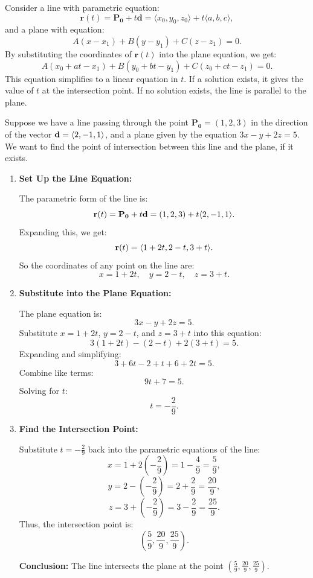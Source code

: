 \noindent Consider a line with parametric equation:
\[
\mathbf{r}(t) = \mathbf{P_0} + t \mathbf{d} = \langle x_0, y_0, z_0 \rangle + t \langle a, b, c \rangle,
\]
and a plane with equation:
\[
A(x - x_1) + B(y - y_1) + C(z - z_1) = 0.
\]
By substituting the coordinates of \( \mathbf{r}(t) \) into the plane equation, we get:
\[
A(x_0 + at - x_1) + B(y_0 + bt - y_1) + C(z_0 + ct - z_1) = 0.
\]
This equation simplifies to a linear equation in \( t \). If a solution exists, it gives the value of \( t \) at the intersection point. If no solution exists, the line is parallel to the plane.


\exampleline
\begin{example}
Suppose we have a line passing through the point \( \mathbf{P_0} = (1, 2, 3) \) in the direction of the vector \( \vb{d} = \langle 2, -1, 1 \rangle \), and a plane given by the equation \( 3x - y + 2z = 5 \). We want to find the point of intersection between this line and the plane, if it exists.

\begin{solution}

\begin{enumerate}
    \item \textbf{Set Up the Line Equation:}

    \noindent The parametric form of the line is:
    \[
    \vb{r}(t) = \vb{P_0} + t \vb{d} = (1, 2, 3) + t \langle 2, -1, 1 \rangle.
    \]
    Expanding this, we get:
    \[
    \vb{r}(t) = \langle 1 + 2t, 2 - t, 3 + t \rangle.
    \]
    So the coordinates of any point on the line are:
    \[
    x = 1 + 2t, \quad y = 2 - t, \quad z = 3 + t.
    \]

    \item \textbf{Substitute into the Plane Equation:}

    \noindent The plane equation is:
    \[
    3x - y + 2z = 5.
    \]
    Substitute \( x = 1 + 2t \), \( y = 2 - t \), and \( z = 3 + t \) into this equation:
    \[
    3(1 + 2t) - (2 - t) + 2(3 + t) = 5.
    \]
    Expanding and simplifying:
    \[
    3 + 6t - 2 + t + 6 + 2t = 5.
    \]
    Combine like terms:
    \[
    9t + 7 = 5.
    \]
    Solving for \( t \):
    \[
    t = -\frac{2}{9}.
    \]

    \item \textbf{Find the Intersection Point:}

    \noindent Substitute \( t = -\frac{2}{9} \) back into the parametric equations of the line:
    \[
    x = 1 + 2\left(-\frac{2}{9}\right) = 1 - \frac{4}{9} = \frac{5}{9},
    \]
    \[
    y = 2 - \left(-\frac{2}{9}\right) = 2 + \frac{2}{9} = \frac{20}{9},
    \]
    \[
    z = 3 + \left(-\frac{2}{9}\right) = 3 - \frac{2}{9} = \frac{25}{9}.
    \]
    Thus, the intersection point is:
    \[
    \left( \frac{5}{9}, \frac{20}{9}, \frac{25}{9} \right).
    \]

\noindent \textbf{Conclusion:} The line intersects the plane at the point \( \left( \frac{5}{9}, \frac{20}{9}, \frac{25}{9} \right) \).
\end{enumerate}
\end{solution}
\end{example}
\exampleline






